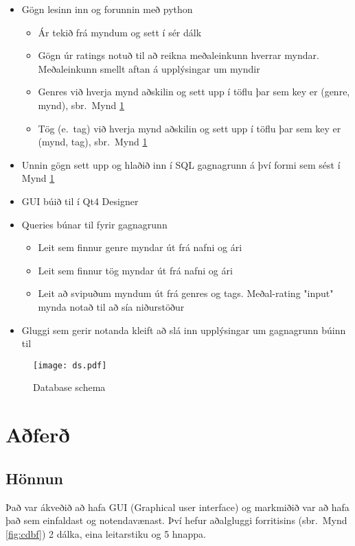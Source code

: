 \documentclass[12pt, git, draft]{rureport}
\begin{document}
\begin{itemize}
	\item Gögn lesinn inn og forunnin með python
	\begin{itemize}
		\item Ár tekið frá myndum og sett í sér dálk
		\item Gögn úr ratings notuð til að reikna meðaleinkunn hverrar myndar. Meðaleinkunn smellt aftan á upplýsingar um myndir
		\item Genres við hverja mynd aðskilin og sett upp í töflu þar sem key er (genre, mynd), sbr.~Mynd \ref{fig:dataschema}
		\item Tög (e.~tag) við hverja mynd aðskilin og sett upp í töflu þar sem key er (mynd, tag), sbr.~Mynd \ref{fig:dataschema}
	\end{itemize}
	\item Unnin gögn sett upp og hlaðið inn í SQL gagnagrunn á því formi sem sést í Mynd \ref{fig:dataschema}
	\item GUI búið til í Qt4 Designer \cite{qt4}
	\item Queries búnar til fyrir gagnagrunn
	\begin{itemize}
		\item Leit sem finnur genre myndar út frá nafni og ári
		\item Leit sem finnur tög myndar út frá nafni og ári
		\item Leit að svipuðum myndum út frá genres og tags. Meðal-rating "input" mynda notað til að sía niðurstöður
	\end{itemize}
	\item Gluggi sem gerir notanda kleift að slá inn upplýsingar um gagnagrunn búinn til
\end{itemize}

\begin{figure}
	\centering 
	\texttt{[image: ds.pdf]}
	\caption{Database schema \label{fig:dataschema}}
\end{figure} 

\section{Aðferð}\label{nidurstodur}
\subsection{Hönnun}
Það var ákveðið að hafa GUI (Graphical user interface) og markmiðið var að hafa það sem einfaldast og notendavænast. Því hefur aðalgluggi forritisins (sbr.~Mynd \ref{fig:cdbf}) 2 dálka, eina leitarstiku og 5 hnappa.
\end{document}
